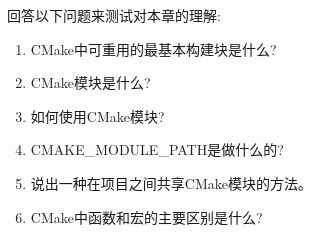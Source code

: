 回答以下问题来测试对本章的理解:

\begin{enumerate}
\item 
CMake中可重用的最基本构建块是什么?

\item 
CMake模块是什么?

\item 
如何使用CMake模块?

\item 
CMAKE\_MODULE\_PATH是做什么的?

\item 
说出一种在项目之间共享CMake模块的方法。

\item 
CMake中函数和宏的主要区别是什么?
\end{enumerate}